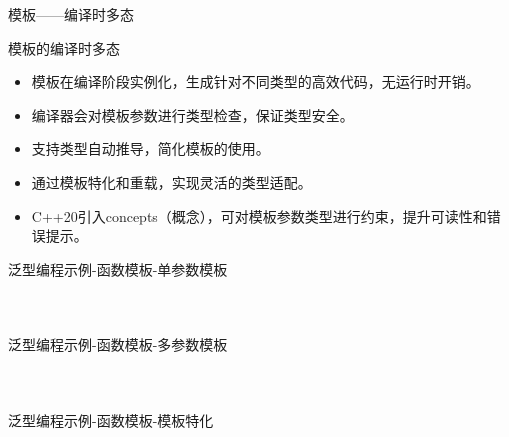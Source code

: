 \documentclass[UTF8,aspectratio=169]{beamer}
\begin{document}
\begin{frame}{模板——编译时多态}
    \begin{ytublock}{模板的编译时多态}
        \begin{itemize}
            \item 模板在编译阶段实例化，生成针对不同类型的高效代码，无运行时开销。
            \item 编译器会对模板参数进行类型检查，保证类型安全。
            \item 支持类型自动推导，简化模板的使用。
            \item 通过模板特化和重载，实现灵活的类型适配。
            \item C++20引入concepts（概念），可对模板参数类型进行约束，提升可读性和错误提示。
        \end{itemize}
    \end{ytublock}
\end{frame}

\begin{frame}[fragile]{泛型编程示例-函数模板-单参数模板}
    \begin{columns}
        \begin{column}{0.48\textwidth}
            \inputminted[firstline=1,lastline=18]{cpp}{code/gp_function_template_1.cpp}
        \end{column}
        \begin{column}{0.48\textwidth}
            \inputminted[firstline=20,lastline=40]{cpp}{code/gp_function_template_1.cpp}
        \end{column}
    \end{columns}
\end{frame}

\begin{frame}[fragile]{泛型编程示例-函数模板-多参数模板}
    \begin{columns}
        \begin{column}{0.48\textwidth}
            \inputminted[firstline=1,lastline=12]{cpp}{code/gp_function_template_2.cpp}
        \end{column}
        \begin{column}{0.48\textwidth}
            \inputminted[firstline=46,lastline=62]{cpp}{code/gp_function_template_2.cpp}
        \end{column}
    \end{columns}
\end{frame}

\begin{frame}[fragile]{泛型编程示例-函数模板-模板特化}
    \begin{columns}
        \begin{column}{0.48\textwidth}
            \inputminted[firstline=1,lastline=13]{cpp}{code/gp_function_template_3.cpp}
        \end{column}
        \begin{column}{0.48\textwidth}
            \inputminted[firstline=15,lastline=25]{cpp}{code/gp_function_template_3.cpp}
        \end{column}
    \end{columns}
\end{frame}
\end{document}

